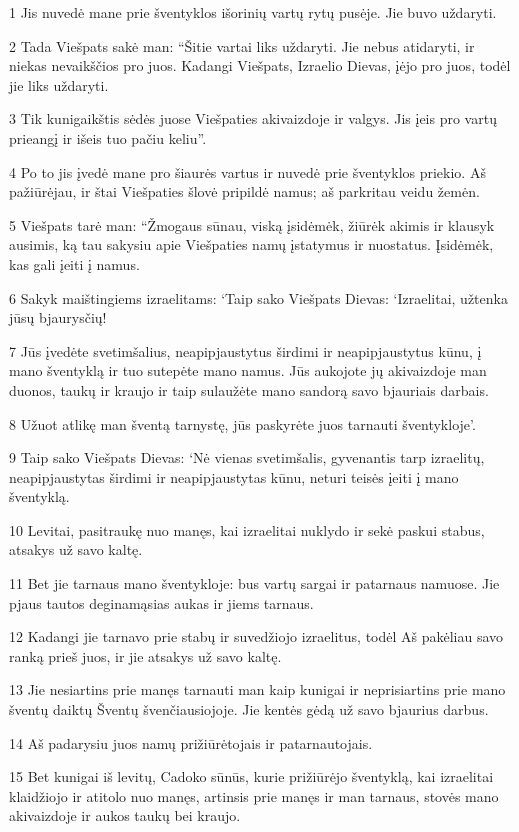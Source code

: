 \par 1 Jis nuvedė mane prie šventyklos išorinių vartų rytų pusėje. Jie buvo uždaryti. 
\par 2 Tada Viešpats sakė man: “Šitie vartai liks uždaryti. Jie nebus atidaryti, ir niekas nevaikščios pro juos. Kadangi Viešpats, Izraelio Dievas, įėjo pro juos, todėl jie liks uždaryti. 
\par 3 Tik kunigaikštis sėdės juose Viešpaties akivaizdoje ir valgys. Jis įeis pro vartų prieangį ir išeis tuo pačiu keliu”. 
\par 4 Po to jis įvedė mane pro šiaurės vartus ir nuvedė prie šventyklos priekio. Aš pažiūrėjau, ir štai Viešpaties šlovė pripildė namus; aš parkritau veidu žemėn. 
\par 5 Viešpats tarė man: “Žmogaus sūnau, viską įsidėmėk, žiūrėk akimis ir klausyk ausimis, ką tau sakysiu apie Viešpaties namų įstatymus ir nuostatus. Įsidėmėk, kas gali įeiti į namus. 
\par 6 Sakyk maištingiems izraelitams: ‘Taip sako Viešpats Dievas: ‘Izraelitai, užtenka jūsų bjaurysčių! 
\par 7 Jūs įvedėte svetimšalius, neapipjaustytus širdimi ir neapipjaustytus kūnu, į mano šventyklą ir tuo sutepėte mano namus. Jūs aukojote jų akivaizdoje man duonos, taukų ir kraujo ir taip sulaužėte mano sandorą savo bjauriais darbais. 
\par 8 Užuot atlikę man šventą tarnystę, jūs paskyrėte juos tarnauti šventykloje’. 
\par 9 Taip sako Viešpats Dievas: ‘Nė vienas svetimšalis, gyvenantis tarp izraelitų, neapipjaustytas širdimi ir neapipjaustytas kūnu, neturi teisės įeiti į mano šventyklą. 
\par 10 Levitai, pasitraukę nuo manęs, kai izraelitai nuklydo ir sekė paskui stabus, atsakys už savo kaltę. 
\par 11 Bet jie tarnaus mano šventykloje: bus vartų sargai ir patarnaus namuose. Jie pjaus tautos deginamąsias aukas ir jiems tarnaus. 
\par 12 Kadangi jie tarnavo prie stabų ir suvedžiojo izraelitus, todėl Aš pakėliau savo ranką prieš juos, ir jie atsakys už savo kaltę. 
\par 13 Jie nesiartins prie manęs tarnauti man kaip kunigai ir neprisiartins prie mano šventų daiktų Šventų švenčiausiojoje. Jie kentės gėdą už savo bjaurius darbus. 
\par 14 Aš padarysiu juos namų prižiūrėtojais ir patarnautojais. 
\par 15 Bet kunigai iš levitų, Cadoko sūnūs, kurie prižiūrėjo šventyklą, kai izraelitai klaidžiojo ir atitolo nuo manęs, artinsis prie manęs ir man tarnaus, stovės mano akivaizdoje ir aukos taukų bei kraujo. 
